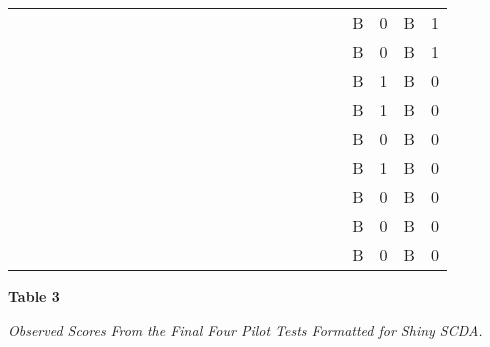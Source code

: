 \documentclass{article}
\begin{document}
\begin{table}
\begin{tabular}{l  l  l  l  l  l  l  l  l  l  l  l  l  l  l  l  l  l}
  &   &   &   &   &   &   &   &   &   &   &   &   &   & B & 0 & B & 1\\
  &   &   &   &   &   &   &   &   &   &   &   &   &   & B & 0 & B & 1\\
  &   &   &   &   &   &   &   &   &   &   &   &   &   & B & 1 & B & 0\\
  &   &   &   &   &   &   &   &   &   &   &   &   &   & B & 1 & B & 0\\
  &   &   &   &   &   &   &   &   &   &   &   &   &   & B & 0 & B & 0\\
  &   &   &   &   &   &   &   &   &   &   &   &   &   & B & 1 & B & 0\\
  &   &   &   &   &   &   &   &   &   &   &   &   &   & B & 0 & B & 0\\
  &   &   &   &   &   &   &   &   &   &   &   &   &   & B & 0 & B & 0\\
  &   &   &   &   &   &   &   &   &   &   &   &   &   & B & 0 & B & 0\\


\end{tabular}


\end{table}


\textbf{Table 3}

\emph{Observed Scores }\emph{From}\emph{ the Final Four Pilot Tests Formatted for Shiny SCDA.}
\end{document}
